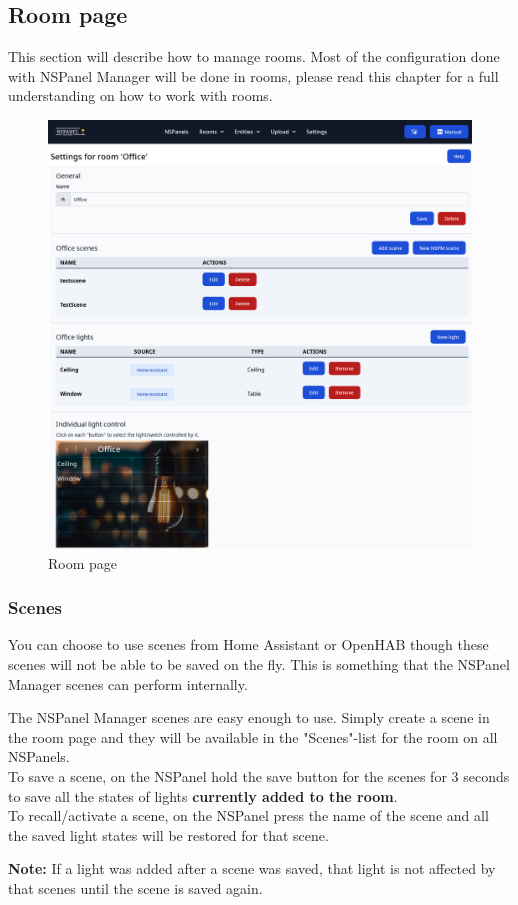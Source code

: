 \documentclass[10pt]{article}
\newcommand{\note}[1]{\begin{noteBox} \textbf{Note:} #1 \end{noteBox}}
\begin{document}
    \hypertarget{sec:room_page}{}
    \subsection{Room page}
    \label{sec:room_page}
    This section will describe how to manage rooms. Most of the configuration done with NSPanel Manager will be done in rooms, please read this chapter for a full understanding on how to work with rooms.

    \begin{figure}[H]
    \centering
    \includegraphics[width=\textwidth,height=\textheight,keepaspectratio]{room_page.png}
    \caption{Room page}%
    \end{figure}
    \subsubsection{Scenes}
    You can choose to use scenes from Home Assistant or OpenHAB though these scenes will not be able to be saved on the fly. This is something that the NSPanel Manager scenes can perform internally.
    
    The NSPanel Manager scenes are easy enough to use. Simply create a scene in the room page and they will be available in the "Scenes"-list for the room on all NSPanels.
    \\ To save a scene, on the NSPanel hold the save button for the scenes for 3 seconds to save all the states of lights \textbf{currently added to the room}.
    \\ To recall/activate a scene, on the NSPanel press the name of the scene and all the saved light states will be restored for that scene.
    \note{If a light was added after a scene was saved, that light is not affected by that scenes until the scene is saved again.}
\end{document}
